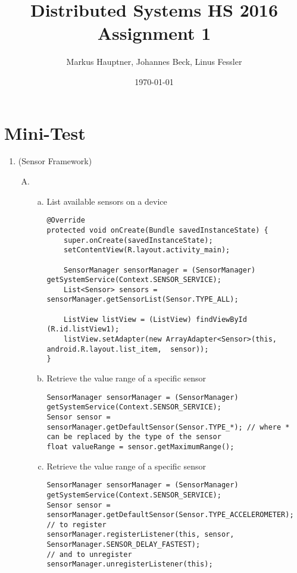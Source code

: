 \documentclass[11pt]{article}
\title{Distributed Systems HS 2016\\Assignment 1}
\author{Markus Hauptner, Johannes Beck, Linus Fessler}
\date{\today}
\begin{document}
\maketitle

\section{Mini-Test}

\begin{enumerate}

\item (Sensor Framework)
\begin{enumerate}[A)]

\item 
\begin{enumerate}[a)]

\item List available sensors on a device
\begin{lstlisting}
@Override
protected void onCreate(Bundle savedInstanceState) {
	super.onCreate(savedInstanceState);
	setContentView(R.layout.activity_main);
	
	SensorManager sensorManager = (SensorManager) getSystemService(Context.SENSOR_SERVICE);
	List<Sensor> sensors = sensorManager.getSensorList(Sensor.TYPE_ALL);
	
	ListView listView = (ListView) findViewById (R.id.listView1);
	listView.setAdapter(new ArrayAdapter<Sensor>(this, android.R.layout.list_item,  sensor));
}
\end{lstlisting}

\item Retrieve the value range of a specific sensor
\begin{lstlisting}
SensorManager sensorManager = (SensorManager) getSystemService(Context.SENSOR_SERVICE);
Sensor sensor = sensorManager.getDefaultSensor(Sensor.TYPE_*); // where * can be replaced by the type of the sensor
float valueRange = sensor.getMaximumRange();
\end{lstlisting}

\item Retrieve the value range of a specific sensor
\begin{lstlisting}
SensorManager sensorManager = (SensorManager) getSystemService(Context.SENSOR_SERVICE);
Sensor sensor = sensorManager.getDefaultSensor(Sensor.TYPE_ACCELEROMETER);
// to register
sensorManager.registerListener(this, sensor, SensorManager.SENSOR_DELAY_FASTEST);
// and to unregister
sensorManager.unregisterListener(this);
\end{lstlisting}


\end{enumerate}
\end{enumerate}
\end{enumerate}
\end{document}
